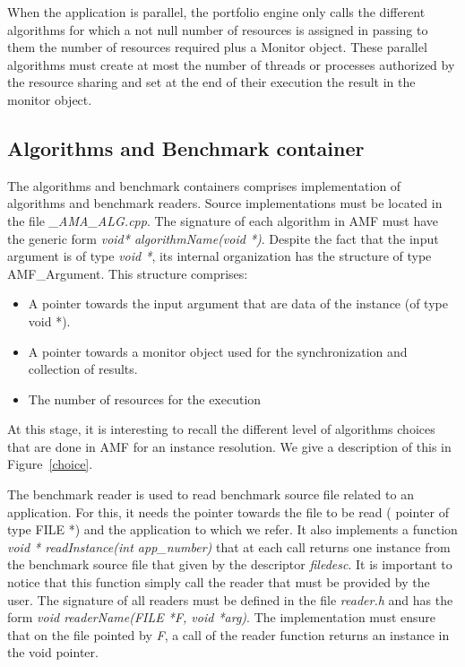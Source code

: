 When the application is parallel, the portfolio engine only calls the different algorithms 
for which a not null number of resources is assigned in passing to them the 
number of resources required plus a Monitor object. These parallel 
algorithms must create at most the number of threads or processes authorized by the resource 
sharing and set at the end of their execution the result in  the monitor object.

\subsection{Algorithms and Benchmark container}

The algorithms and benchmark containers comprises implementation of algorithms and 
benchmark readers. Source implementations must be located in the file \textit{\_AMA\_ALG.cpp}. 
The signature of each algorithm in AMF must have the generic form \textit{void* algorithmName(void *)}. 
Despite the fact that the input argument is of type \textit{void *}, its internal organization has the structure of 
type AMF\_Argument. This structure comprises:
\begin{itemize}
\item A pointer towards the input argument that are data of the instance (of type void *).
\item A pointer towards a monitor object used for the synchronization and collection of results. 
\item The number of resources for the execution
\end{itemize}
At this stage, it is interesting to recall the different level of algorithms choices that 
are done in AMF for an instance resolution. We give a description of this in Figure~\ref{choice}. 

The benchmark reader is used to read benchmark source file related to an application. 
For this, it needs the pointer towards the file to be read ( pointer of type FILE *) and 
the application to which we refer. It also implements a function \textit{ void * readInstance(int app\_number)} 
that at each call returns one instance from the benchmark source file that given by the 
descriptor \textit{filedesc}. It is important to notice that this function 
simply call the reader that must be provided by the user. The signature of all readers must be defined 
in the file \textit{reader.h} and has the form \textit{void readerName(FILE *F, void *arg)}. The 
implementation must ensure that on the file pointed by \textit{F}, a call of the reader function 
returns an instance in the void pointer.



